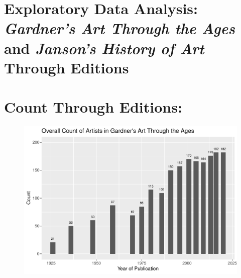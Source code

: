 \documentclass[
  letterpaper,
  DIV=11,
  numbers=noendperiod]{scrreprt}
\begin{document}
\hypertarget{exploratory-data-analysis-gardners-art-through-the-ages-and-jansons-history-of-art-through-editions}{%
\section{\texorpdfstring{Exploratory Data Analysis: \emph{Gardner's Art
Through the Ages} and \emph{Janson's History of Art} Through
Editions}{Exploratory Data Analysis: Gardner's Art Through the Ages and Janson's History of Art Through Editions}}\label{exploratory-data-analysis-gardners-art-through-the-ages-and-jansons-history-of-art-through-editions}}

\hypertarget{count-through-editions}{%
\section{\texorpdfstring{\textbf{Count Through
Editions:}}{Count Through Editions:}}\label{count-through-editions}}

\begin{figure}

{\centering \includegraphics{Chapter1/Chapter1_files/figure-pdf/gardnercountthroughtime-1.pdf}

}

\end{figure}
\end{document}
